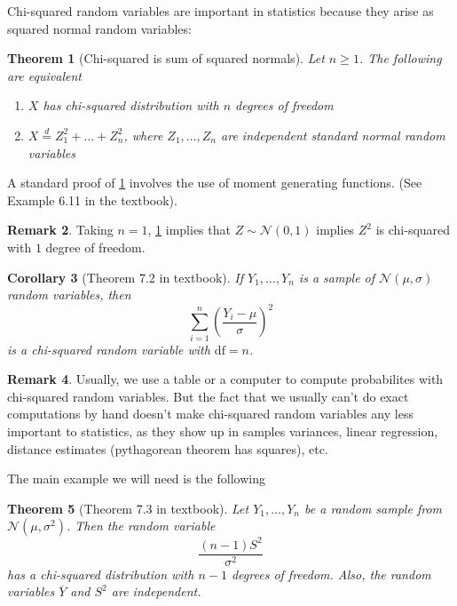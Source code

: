 \documentclass[10pt]{article}
\newtheorem{theorem}{Theorem}
\newtheorem{corollary}[theorem]{Corollary}
\theoremstyle{definition}
\newtheorem{remark}[theorem]{Remark}
\newcommand{\1}[1]{\textbf{1}_{\left[#1\right]}} %
\begin{document}
Chi-squared random variables are important in statistics because they arise as
squared normal random variables:

\begin{theorem}[Chi-squared is sum of squared normals]
  \label{thm:chi-squared-sum-squared-normals}
  Let $n \geq 1$. The following are equivalent
  \begin{enumerate}[label={\rm (\roman*.)}]
    \item $X$ has chi-squared distribution with $n$ degrees of freedom
    \item $X\overset{d}{=}Z_{1}^{2}+\ldots+Z_{n}^{2}$, where
    $Z_{1},\ldots,Z_{n}$ are independent standard normal random variables
  \end{enumerate}
\end{theorem}

A standard proof of \cref{thm:chi-squared-sum-squared-normals} involves the
use of moment generating functions. (See Example 6.11 in the textbook).

\begin{remark}
  Taking $n=1$, \cref{thm:chi-squared-sum-squared-normals} implies that $Z \sim
  \mathcal{N}(0,1)$ implies $Z^{2}$ is chi-squared with $1$ degree of freedom.
\end{remark}

\begin{corollary}[Theorem 7.2 in textbook]
  \label{claim:theorem-7.2-textbook}
  If $Y_{1},\ldots,Y_{n}$ is a sample of $\mathcal{N}(\mu,\sigma)$ random
  variables, then
  \begin{equation*}
    \sum_{i=1}^{n} \left( \frac{Y_{i}-\mu}{\sigma} \right)^{2} 
  \end{equation*}
  is a chi-squared random variable with $\mathrm{df}=n$. 
\end{corollary}

\begin{remark}
  Usually, we use a table or a computer to compute probabilites with
  chi-squared random variables. But the fact that we usually can't do exact
  computations by hand doesn't make chi-squared random variables any less
  important to statistics, as they show up in samples variances, linear
  regression, distance estimates (pythagorean theorem has squares), etc.
\end{remark}

The main example we will need is the following
\begin{theorem}[Theorem 7.3 in textbook]
  \label{thm:theorem-7.3-textbook}
  Let $Y_{1},\ldots,Y_{n}$ be a random sample from
  $\mathcal{N}(\mu,\sigma^{2})$. Then the random variable
  \begin{equation*}
    \frac{(n-1)S^{2}}{\sigma^{2}}
  \end{equation*}
  has a chi-squared distribution with $n-1$ degrees of freedom. Also, the
  random variables $\overline{Y}$ and $S^{2}$ are independent.
\end{theorem}
\end{document}
